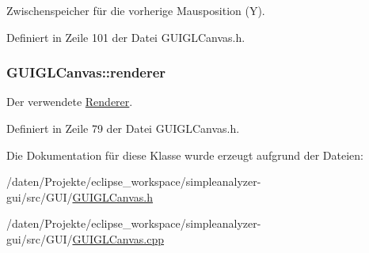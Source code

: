 Zwischenspeicher für die vorherige Mausposition (Y). 



Definiert in Zeile 101 der Datei G\-U\-I\-G\-L\-Canvas.\-h.

\hypertarget{classGUIGLCanvas_a33a4ad3bc364d697396c55d011bfac44}{
\subsubsection[{renderer}]{ G\-U\-I\-G\-L\-Canvas\-::renderer\hspace{0.3cm}{\ttfamily [private]}}}\label{classGUIGLCanvas_a33a4ad3bc364d697396c55d011bfac44}


Der verwendete \hyperlink{classRenderer}{Renderer}. 



Definiert in Zeile 79 der Datei G\-U\-I\-G\-L\-Canvas.\-h.



Die Dokumentation für diese Klasse wurde erzeugt aufgrund der Dateien\-:\begin{DoxyCompactItemize}
\item 
/daten/\-Projekte/eclipse\-\_\-workspace/simpleanalyzer-\/gui/src/\-G\-U\-I/\hyperlink{GUIGLCanvas_8h}{G\-U\-I\-G\-L\-Canvas.\-h}\item 
/daten/\-Projekte/eclipse\-\_\-workspace/simpleanalyzer-\/gui/src/\-G\-U\-I/\hyperlink{GUIGLCanvas_8cpp}{G\-U\-I\-G\-L\-Canvas.\-cpp}\end{DoxyCompactItemize}
